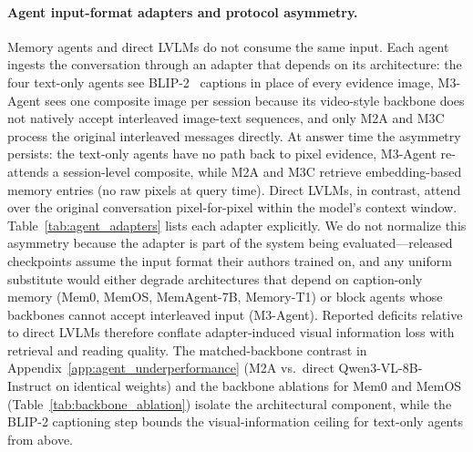 \documentclass{llmxive}
\begin{document}
\paragraph{Agent input-format adapters and protocol asymmetry.}
Memory agents and direct LVLMs do not consume the same input. Each agent ingests the conversation through an adapter that depends on its architecture: the four text-only agents see BLIP-2~\cite{li2023blip2} captions in place of every evidence image, M3-Agent sees one composite image per session because its video-style backbone does not natively accept interleaved image-text sequences, and only M2A and M3C process the original interleaved messages directly. At answer time the asymmetry persists: the text-only agents have no path back to pixel evidence, M3-Agent re-attends a session-level composite, while M2A and M3C retrieve embedding-based memory entries (no raw pixels at query time). Direct LVLMs, in contrast, attend over the original conversation pixel-for-pixel within the model's context window. Table~\ref{tab:agent_adapters} lists each adapter explicitly. We do not normalize this asymmetry because the adapter is part of the system being evaluated---released checkpoints assume the input format their authors trained on, and any uniform substitute would either degrade architectures that depend on caption-only memory (Mem0, MemOS, MemAgent-7B, Memory-T1) or block agents whose backbones cannot accept interleaved input (M3-Agent). Reported deficits relative to direct LVLMs therefore conflate adapter-induced visual information loss with retrieval and reading quality. The matched-backbone contrast in Appendix~\ref{app:agent_underperformance} (M2A vs.\ direct Qwen3-VL-8B-Instruct on identical weights) and the backbone ablations for Mem0 and MemOS (Table~\ref{tab:backbone_ablation}) isolate the architectural component, while the BLIP-2 captioning step bounds the visual-information ceiling for text-only agents from above.
\end{document}
